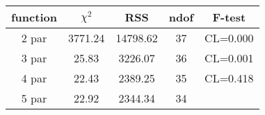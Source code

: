 \begin{tabular}{c|c|c|c|c}
function & $\chi^2$ & RSS & ndof & F-test \\
\hline
2 par & 3771.24 & 14798.62 & 37 & CL=0.000 \\
3 par & 25.83 & 3226.07 & 36 & CL=0.001 \\
4 par & 22.43 & 2389.25 & 35 & CL=0.418 \\
5 par & 22.92 & 2344.34 & 34 & \\
\hline
\end{tabular}